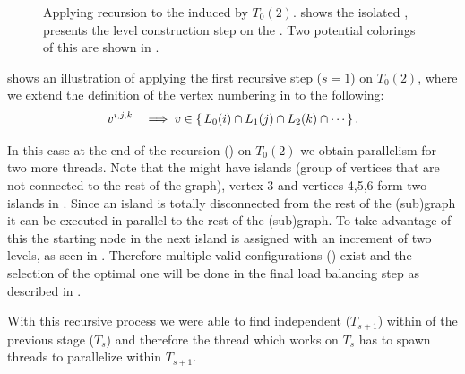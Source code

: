 \begin{figure}[t]
	     \hspace{1.75em}
     	\caption{Applying recursion to the \subgraph induced by $T_0(2)$.  shows the isolated \subgraph,  presents the level construction step on the \subgraph. Two potential \DONE colorings of this  \subgraph are shown in .}
     	
     	\label{fig:rec_d1_s2}
     \end{figure}
     
      shows an illustration of applying the first recursive step ($s=1$) on $T_0(2)$, where we extend the definition of the vertex numbering in  to the following:
	 \begin{equation}
	    v^{i,j,k...} \implies v \in \set{L_0(i) \cap L_1(j) \cap L_2(k) \cap \cdots}.
	 \end{equation}
	 
     In this case at the end of the recursion (\cf {}) on $T_0(2)$ we obtain parallelism for two more threads. Note that the \subgraphs might have islands (group of vertices that are not connected to the rest of the graph), \eg vertex 3 and vertices 4,5,6 form two islands in . Since an island is totally disconnected from the rest of the (sub)graph it can be executed in parallel to the rest of the (sub)graph. To take advantage of this the starting node in the next island is assigned with an increment of two levels, as seen in . Therefore multiple valid \DONE configurations (\cf {}) exist and the selection of the optimal one will be done in the final load balancing step as described in .    
     
     With this recursive process we were able to find independent \levelGroups ($T_{s+1}$) within \levelGroup of the previous stage ($T_s$) and therefore the thread which works on $T_s$ has to spawn threads to parallelize within $T_{s+1}$.
     
